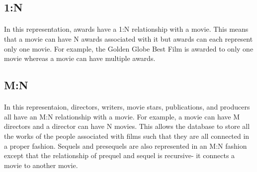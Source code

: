\documentclass[12pt]{article}
\begin{document}
\subsection{1:N}
\paragraph{}In this representation, awards have a 1:N relationship with a movie. This means that a movie can have N awards associated with it but awards can each represent only one movie. For example, the Golden Globe Best Film is awarded to only one movie whereas a movie can have multiple awards.
\subsection{M:N}
\paragraph{}In this representaion, directors, writers, movie stars, publications, and producers all have an M:N relationship with a movie. For example, a movie can have M directors and a director can have N movies. This allows the database to store all the works of the people associated with films such that they are all connected in a proper fashion. Sequels and presequels are also represented in an M:N fashion except that the relationship of prequel and sequel is recursive- it connects a movie to another movie.
\end{document}
